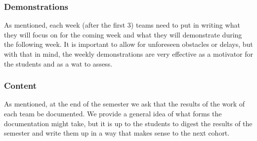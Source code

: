 \subsubsection{Demonstrations}
As mentioned, each week (after the first 3) teams need to put in writing what they will focus on for the coming week and what they will demonstrate during the following week. It is important to allow for unforeseen obstacles or delays, but with that in mind, the weekly demonstrations are very effective as a motivator for the students and as a wat to assess.

\subsubsection{Content}As mentioned, at the end of the semester we ask that the results of the work of each team be documented. We provide a general idea of what forms the documentation might take, but it is up to the students to digest the results of the semester and write them up in a way that makes sense to the next cohort.


